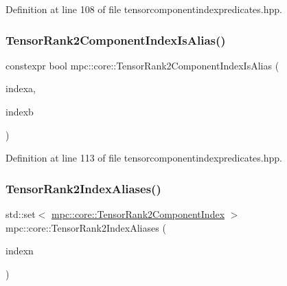 Definition at line 108 of file tensorcomponentindexpredicates.\+hpp.

\mbox{\label{namespacempc_1_1core_a4968c91b710a9f3384869b2de32dd7de}} 
\subsubsection{\texorpdfstring{Tensor\+Rank2\+Component\+Index\+Is\+Alias()}{TensorRank2ComponentIndexIsAlias()}}
{\footnotesize\ttfamily constexpr bool mpc\+::core\+::\+Tensor\+Rank2\+Component\+Index\+Is\+Alias (\begin{DoxyParamCaption}\item[{const \mbox{\hyperlink{namespacempc_1_1core_a7ae080dac58868c1e167479dce34928a}{mpc\+::core\+::\+Tensor\+Rank2\+Component\+Index}} \&}]{indexa,  }\item[{const \mbox{\hyperlink{namespacempc_1_1core_a7ae080dac58868c1e167479dce34928a}{mpc\+::core\+::\+Tensor\+Rank2\+Component\+Index}} \&}]{indexb }\end{DoxyParamCaption})\hspace{0.3cm}{\ttfamily [inline]}}



Definition at line 113 of file tensorcomponentindexpredicates.\+hpp.

\mbox{\label{namespacempc_1_1core_ac57e02dffa1feb89711fd3abab43faff}} 
\subsubsection{\texorpdfstring{Tensor\+Rank2\+Index\+Aliases()}{TensorRank2IndexAliases()}}
{\footnotesize\ttfamily std\+::set$<$ \mbox{\hyperlink{namespacempc_1_1core_a7ae080dac58868c1e167479dce34928a}{mpc\+::core\+::\+Tensor\+Rank2\+Component\+Index}} $>$ mpc\+::core\+::\+Tensor\+Rank2\+Index\+Aliases (\begin{DoxyParamCaption}\item[{const \mbox{\hyperlink{classmpc_1_1core_1_1_tensor_rank_n_component_index}{mpc\+::core\+::\+Tensor\+Rank\+N\+Component\+Index}}$<$ 2 $>$ \&}]{indexn }\end{DoxyParamCaption})\hspace{0.3cm}{\ttfamily [inline]}}



